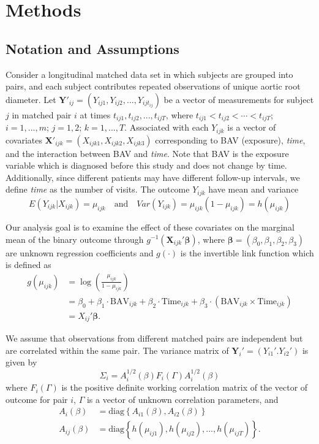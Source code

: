 \documentclass[
]{aft}
\begin{document}
\section{Methods}\label{methods}

\subsection{Notation and Assumptions}\label{notation-and-assumptions}

Consider a longitudinal matched data set in which subjects are grouped
into pairs, and each subject contributes repeated observations of unique
aortic root diameter. Let
\(\boldsymbol{Y}'_{ij} = (Y_{ij1}, Y_{ij2}, ..., Y_{ijt_{ij}})\) be a
vector of measurements for subject \(j\) in matched pair \(i\) at times
\(t_{ij1}, t_{ij2}, ..., t_{ijT}\), where
\(t_{ij1} < t_{ij2} < \cdots < t_{ijT}\); \(i = 1,..., m\);
\(j = 1, 2\); \(k = 1,...,T\). Associated with each \(Y_{ijk}\) is a
vector of covariates
\(\boldsymbol{X}'_{ijk} = (X_{ijk1}, X_{ijk2}, X_{ijk3})\) corresponding
to BAV (exposure), \emph{time}, and the interaction between BAV and
\emph{time}. Note that BAV is the exposure variable which is diagnosed
before this study and does not change by time. Additionally, since
different patients may have different follow-up intervals, we define
\emph{time} as the number of visits. The outcome \(Y_{ijk}\) have mean
and variance \[
E(Y_{ijk} | X_{ijk}) = \mu_{ijk} \quad \text{and} \quad Var(Y_{ijk}) = \mu_{ijk}(1-\mu_{ijk}) = h(\mu_{ijk})
\]

Our analysis goal is to examine the effect of these covariates on the
marginal mean of the binary outcome through
\(g^{-1}(\boldsymbol{X}_{ijk}'\boldsymbol{\beta})\), where
\(\boldsymbol{\beta} = (\beta_0, \beta_1, \beta_2,\beta_3)\) are unknown
regression coefficients and \(g(\cdot)\) is the invertible link function
which is defined as \[
\begin{aligned}
g(\mu_{ijk}) &= \log(\frac{\mu_{ijk}}{1-\mu_{ijk}}) \\
&= \beta_0 + \beta_1\cdot \text{BAV}_{ijk} + \beta_2 \cdot \text{Time}_{ijk} + \beta_3\cdot (\text{BAV}_{ijk} \times \text{Time}_{ijk})\\
&= X_{ij}'\boldsymbol{\beta}.
\end{aligned}
\]

We assume that observations from different matched pairs are independent
but are correlated within the same pair. The variance matrix of
\(\boldsymbol{Y}_i' = (Y_{i1}'. Y_{i2}')\) is given by \[
\Sigma_i = A_i^{1/2}(\beta) F_i(\Gamma) A_i^{1/2} (\beta) 
\] where \(F_i(\Gamma)\) is the positive definite working correlation
matrix of the vector of outcome for pair \(i\), \(\Gamma\) is a vector
of unknown correlation parameters, and \begin{align}
A_i(\beta) &= \text{diag}\left\{A_{i1}(\beta), A_{i2}(\beta)\right\} \label{eq: Aibeta}\\
A_{ij}(\beta) & = \text{diag}\left\{h(\mu_{ij1}), h(\mu_{ij2}),...,h(\mu_{ijT})\right\} \label{eq: Aij}.
\end{align}
\end{document}
